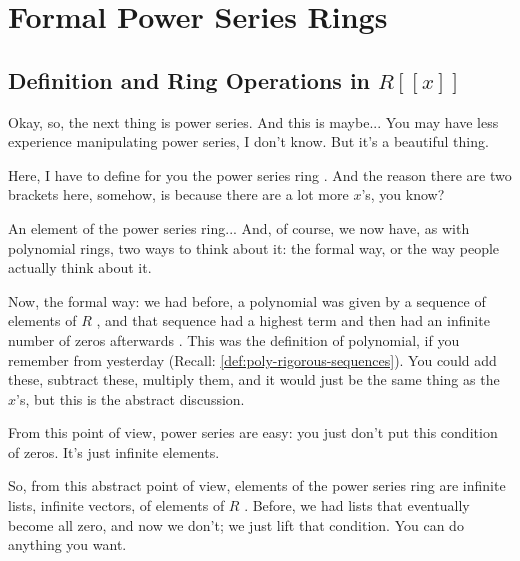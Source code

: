 \begin{hidden}
\end{hidden}

\section{Formal Power Series Rings}

\subsection{Definition and Ring Operations in \texorpdfstring{$R[[x]]$}{R[[x]]}}

\begin{speech}[00:25:19 - 00:27:02]

Okay, so, the next thing is power series. And this is maybe... You may have less experience manipulating power series, I don't know. But it's a beautiful thing.

Here, I have to define for you the power series ring . And the reason there are two brackets here, somehow, is because there are a lot more $x$'s, you know? 

An element of the power series ring... And, of course, we now have, as with polynomial rings, two ways to think about it: the formal way, or the way people actually think about it.

Now, the formal way: we had before, a polynomial was given by a sequence of elements of $R$ , and that sequence had a highest term and then had an infinite number of zeros afterwards . This was the definition of polynomial, if you remember from yesterday (Recall: \cref{def:poly-rigorous-sequences}). You could add these, subtract these, multiply them, and it would just be the same thing as the $x$'s, but this is the abstract discussion.

From this point of view, power series are easy: you just don't put this condition of zeros. It's just infinite elements. 

So, from this abstract point of view, elements of the power series ring are infinite lists, infinite vectors, of elements of $R$ . Before, we had lists that eventually become all zero, and now we don't; we just lift that condition. You can do anything you want.
\end{speech}


